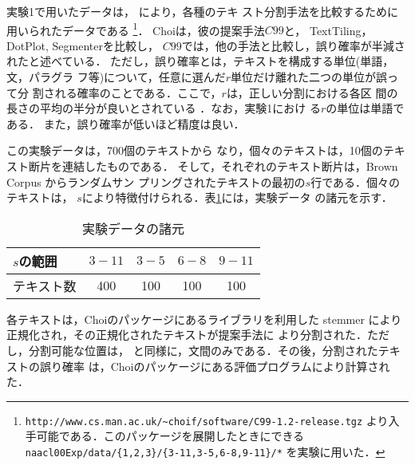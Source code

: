 実験1で用いたデータは， \cite{choi00:_advan}により，各種のテキ
スト分割手法を比較するために用いられたデータである
\footnote{{\tt http://www.cs.man.ac.uk/\~{}choif/software/C99-1.2-release.tgz} より入手可能である．このパッケージを展開したときにできる {\tt naacl00Exp/data/\{1,2,3\}/\{3-11,3-5,6-8,9-11\}/*} を実験に用いた．}．
Choiは，彼の提案手法$C99$と，
TextTiling\cite{hearst94:_multi_parag_segmen_expos_text}，
DotPlot\cite{reynar98:_topic},
Segmenter\cite{kan98:_linear_segmen_segmen_signif}を比較し，
$C99$では，他の手法と比較し，誤り確率が半減されたと述べている．
ただし，誤り確率とは，テキストを構成する単位(単語，文，パラグラ
フ等)について，任意に選んだ$r$単位だけ離れた二つの単位が誤って分
割される確率のことである．ここで，$r$は，正しい分割における各区
間の長さの平均の半分が良いとされている
\cite{beeferman99:_statis_model_text_segmen}．なお，実験1におけ
る$r$の単位は単語である． また，誤り確率が低いほど精度は良い．

この実験データは，700個のテキストから
なり，個々のテキストは，10個のテキスト断片を連結したものである．
そして，それぞれのテキスト断片は，Brown Corpus からランダムサン
プリングされたテキストの最初の$s$行である．個々のテキストは，
$s$により特徴付けられる．表\ref{tab:testcorpus}には，実験データ
の諸元を示す．

\begin{table}[htbp]
  \begin{center}
    \caption{実験データの諸元}
    \begin{tabular}{|l|c|c|c|c|}
      \hline
      $s$の範囲  & $3 - 11$ & $3 - 5$ & $6 - 8$ & $9 - 11$ \\ \hline
      テキスト数 & 400      &  100    &  100    & 100 \\ \hline
    \end{tabular}
    \label{tab:testcorpus}
  \end{center}
\end{table}

各テキストは，Choiのパッケージにあるライブラリを利用した 
stemmer により正規化され，その正規化されたテキストが提案手法に
より分割された．ただし，分割可能な位置は，\cite{choi00:_advan}
と同様に，文間のみである．その後，分割されたテキストの誤り確率
は，Choiのパッケージにある評価プログラムにより計算された．

